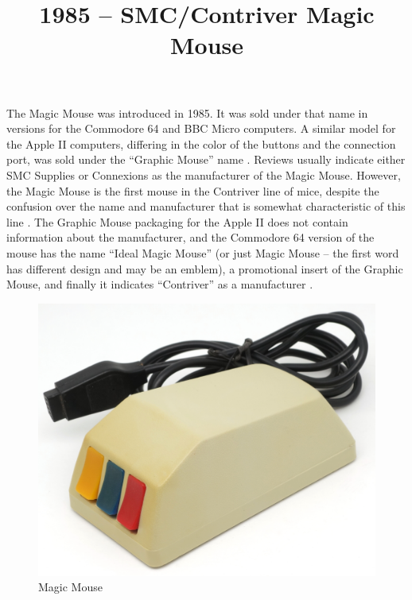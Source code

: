 \documentclass[11pt, a4paper]{article}
\begin{document}
\title{1985 -- SMC/Contriver Magic Mouse}
\date{}
\maketitle
{}

The Magic Mouse was introduced in 1985. It was sold under that name in versions for the Commodore 64 and BBC Micro computers. A similar model for the Apple II computers, differing in the color of the buttons and the connection port, was sold under the ``Graphic Mouse'' name \cite{SMC_Mouse_Commodore1}. Reviews usually indicate either SMC Supplies \cite{c64wiki, SMC_Mouse_Commodore3} or Connexions \cite{SMC_Mouse_Commodore2} as the manufacturer of the Magic Mouse. However, the Magic Mouse is the first mouse in the Contriver line of mice, despite the confusion over the name and manufacturer that is somewhat characteristic of this line \cite{reddit}. The Graphic Mouse packaging for the Apple II does not contain information about the manufacturer, and the Commodore 64 version of the mouse has the name ``Ideal Magic Mouse'' (or just Magic Mouse -- the first word has different design and may be an emblem), a promotional insert of the Graphic Mouse, and finally it indicates ``Contriver'' as a manufacturer \cite{CHM}.

\begin{figure}[h]
   \centering
    \includegraphics[scale=0.62]{1985_smc_contriver_magic_mouse/pic_30.jpg}
    \caption{Magic Mouse}
    \label{fig:MagicMousePic}
\end{figure}
\end{document}
